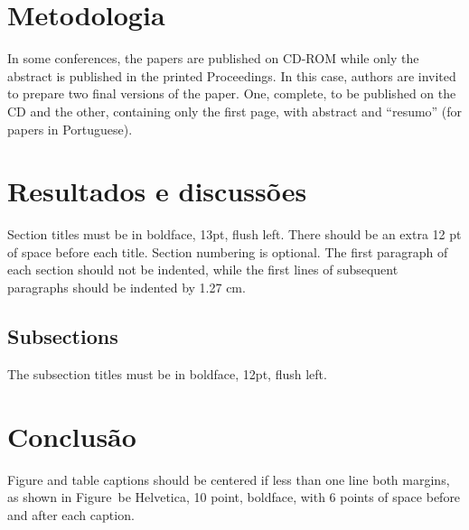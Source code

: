 \documentclass[12pt]{article}
\begin{document}
\section{Metodologia}

In some conferences, the papers are published on CD-ROM while only the abstract
is published in the printed Proceedings. In this case, authors are invited to
prepare two final versions of the paper. One, complete, to be published on the
CD and the other, containing only the first page, with abstract and ``resumo''
(for papers in Portuguese).

\section{Resultados e discussões}

Section titles must be in boldface, 13pt, flush left. There should be an extra
12 pt of space before each title. Section numbering is optional. The first
paragraph of each section should not be indented, while the first lines of
subsequent paragraphs should be indented by 1.27 cm.

\subsection{Subsections}

The subsection titles must be in boldface, 12pt, flush left.

\section{Conclusão}\label{sec:figs}

Figure and table captions should be centered if less than one line
both margins, as shown in Figure~be Helvetica, 10 point, boldface, with 6
points of space before and after each caption.%


\end{document}
